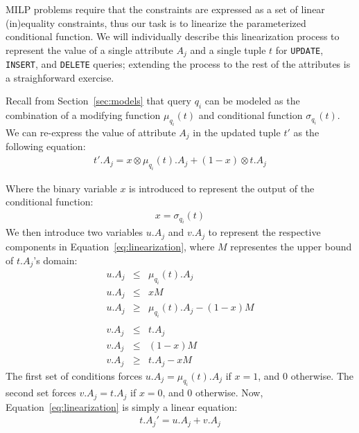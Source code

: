 
MILP problems require that the constraints are expressed as a set of linear
(in)equality constraints, thus our task is to linearize the parameterized
conditional function.   We will individually describe this linearization process 
to represent the value of a single attribute $A_j$ and a single tuple $t$ for 
\texttt{UPDATE}, \texttt{INSERT}, and \texttt{DELETE} queries; 
extending the process to the rest of the attributes is a straighforward exercise.



Recall from Section~\ref{sec:models} that query $q_i$ can be modeled as
the combination of a modifying function $\mu_{q_i}(t)$ and conditional function $\sigma_{q_i}(t)$.
We can re-express the value of attribute $A_j$ in the updated tuple $t'$ as the following equation:
{\scriptsize
\begin{eqnarray}
\label{eq:linearization}
t'.A_j = x\otimes \mu_{q_i}(t).A_j + (1-x)\otimes t.A_j 
\end{eqnarray} 
}


\noindent Where the binary variable $x$ is introduced to represent the output of 
the conditional function:
{\scriptsize
\begin{eqnarray}
\label{eq:x}
x = \sigma_{q_i}(t)
\end{eqnarray}
}
We then introduce two variables $u.A_j$ and $v.A_j$ to represent 
the respective components in Equation~\ref{eq:linearization}, where
$M$ representes the upper bound of $t.A_j$'s domain:
{\scriptsize 
\begin{eqnarray}
\label{eq:uv}
u.A_j &\leq & \mu_{q_i}(t).A_j \nonumber\\
u.A_j &\leq & xM \nonumber\\ 
u.A_j &\geq & \mu_{q_i}(t).A_j - (1-x)M \nonumber \\\nonumber \\
v.A_j &\leq & t.A_j \nonumber\\
v.A_j &\leq & (1-x)M \nonumber\\
v.A_j &\geq & t.A_j - xM
\end{eqnarray}
}
The first set of conditions forces $u.A_j = \mu_{q_i}(t).A_j$ if $x=1$, and $0$ otherwise.  
The second set forces $v.A_j = t.A_j$ if $x=0$, and $0$ otherwise.  
Now, Equation~\ref{eq:linearization} is simply a linear equation:
{\scriptsize\begin{eqnarray}
\label{eq:tnew}
t.A_j' = u.A_j + v.A_j
\end{eqnarray}}



